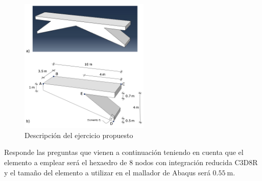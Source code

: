 \documentclass[spanish,a4paper,12pt]{article}
\begin{document}
\begin{figure}[!h]
  \begin{center}
    \includegraphics[width=0.55\textwidth]{./figs/prop}
  \end{center}
  \caption{Descripción del ejercicio propuesto}
  \label{figuprop1}
\end{figure}

Responde las preguntas que vienen a continuación teniendo en cuenta que el elemento a emplear será el hexaedro de 8 nodos con integración reducida C3D8R y el tamaño del elemento a utilizar en el mallador de Abaqus será $0.55 \mathrm{~m}$.
\end{document}
